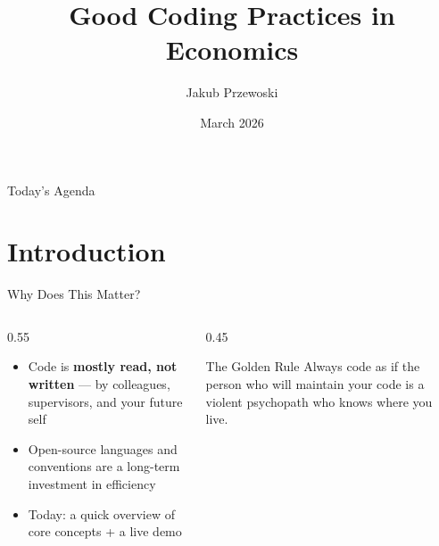 \documentclass[13pt, aspectratio=169]{beamer}
\title{Good Coding Practices in Economics}
\author{Jakub Przewoski}
\date{March 2026}
\begin{document}
\maketitle

\begin{frame}{Today's Agenda}
    \tableofcontents
\end{frame}

\section{Introduction}

\begin{frame}{Why Does This Matter?}
    \begin{columns}
        \begin{column}{0.55\textwidth}
            \begin{itemize}
                \item Code is \textbf{mostly read, not written} — by colleagues, supervisors, and your future self
                \item Open-source languages and conventions are a long-term investment in efficiency
                \item Today: a quick overview of core concepts + a \alert{live demo}
            \end{itemize}
        \end{column}
        \begin{column}{0.45\textwidth}
            \begin{block}{The Golden Rule}
                Always code as if the person who will maintain your code is a violent psychopath who knows where you live.
            \end{block}
        \end{column}
    \end{columns}
\end{frame}
\end{document}
